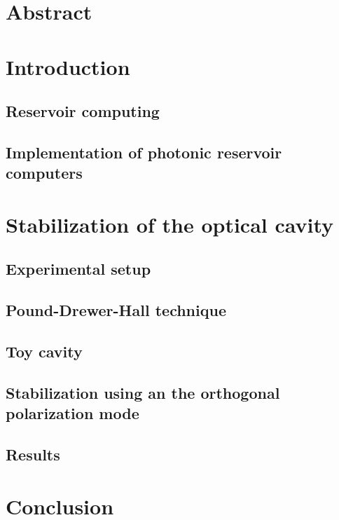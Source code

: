 









\chapter*{Abstract}

\tableofcontents
\listoffigures

\chapter{Introduction}

\section{Reservoir computing}

\section{Implementation of photonic reservoir computers}

\chapter{Stabilization of the optical cavity}

\section{Experimental setup}

\section{Pound-Drewer-Hall technique}

\section{Toy cavity}

\section{Stabilization using an the orthogonal polarization mode}

\section{Results}

\chapter{Conclusion}


\printbibliography
	
